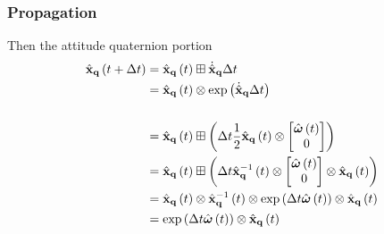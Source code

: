 \documentclass{beamer}
\begin{document}
\begin{frame}
\frametitle{Propagation}
Then the attitude quaternion portion 
\begin{align}
\hat{{\bf x}}_{{\bf q}}\left(t+\Delta t\right) & =\hat{{\bf x}}_{{\bf q}}\left(t\right)\boxplus\dot{\hat{{\bf x}}}_{{\bf q}}\Delta t\\
 & =\hat{{\bf x}}_{{\bf q}}\left(t\right)\otimes\exp\left(\dot{\hat{{\bf x}}}_{{\bf q}}\Delta t\right)\\
\\
 & =\hat{{\bf x}}_{{\bf q}}\left(t\right)\boxplus\left(\Delta t\dfrac{1}{2}\hat{{\bf x}}_{{\bf q}}\left(t\right)\otimes\begin{bmatrix}\hat{\boldsymbol{\omega}}\left(t\right)\\
0
\end{bmatrix}\right)\\
 & =\hat{{\bf x}}_{{\bf q}}\left(t\right)\boxplus\left(\Delta t\hat{{\bf x}}_{{\bf q}}^{-1}\left(t\right)\otimes\begin{bmatrix}\hat{\boldsymbol{\omega}}\left(t\right)\\
0
\end{bmatrix}\otimes\hat{{\bf x}}_{{\bf q}}\left(t\right)\right)\\
 & =\hat{{\bf x}}_{{\bf q}}\left(t\right)\otimes\hat{{\bf x}}_{{\bf q}}^{-1}\left(t\right)\otimes\exp\left(\Delta t\hat{\boldsymbol{\omega}}\left(t\right)\right)\otimes\hat{{\bf x}}_{{\bf q}}\left(t\right)\\
 & =\exp\left(\Delta t\hat{\boldsymbol{\omega}}\left(t\right)\right)\otimes\hat{{\bf x}}_{{\bf q}}\left(t\right)
\end{align}
\end{frame}
\end{document}
